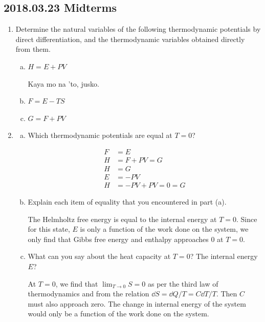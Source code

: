 \documentclass[9pt,a4paper,twocolumn]{article}
\begin{document}
\subsection{2018.03.23 Midterms}
\begin{enumerate}[1.]

	\item Determine the natural variables of the following thermodynamic potentials by direct differentiation, and the thermodynamic variables obtained directly from them.
	\begin{enumerate}[(a)]
	
		\item $H = E + PV$
		
		Kaya mo na 'to, jusko.
		
		\item $F = E - TS$
		
		\item $G = F + PV$
	
	\end{enumerate}
	
	\item
	\begin{enumerate}[(a)]
	
		\item Which thermodynamic potentials are equal at $T=0$?
		
		\begin{align}
			F &= E \\
			H &= F + PV = G \\
			H &= G \\
			E &= - PV \\
			H &= -PV + PV = 0 = G
		\end{align}
		
		\item Explain each item of equality that you encountered in part (a).
		
		The Helmholtz free energy is equal to the internal energy at $T=0$. Since for this state, $E$ is only a function of the work done on the system, we only find that Gibbs free energy and enthalpy approaches 0 at $T=0$.
		
		\item What can you say about the heat capacity at $T = 0$? The internal energy $E$?
		
		At $T=0$, we find that $\lim_{T\rightarrow 0} S = 0$ as per the third law of thermodynamics and from the relation $\dd{S} = \dd{Q}/T = C\dd{T}/T$. Then $C$ must also approach zero. The change in internal energy of the system would only be a function of the work done on the system.
	

\end{enumerate}
\end{enumerate}
\end{document}
